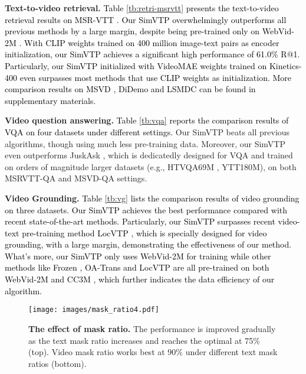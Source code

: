 \documentclass[10pt,twocolumn,letterpaper]{article}
\newcommand{\yty}[1]{\textcolor{black}{#1}}
\begin{document}
\noindent\textbf{Text-to-video retrieval.}
\yty{Table \ref{tb:retri-msrvtt} presents the text-to-video retrieval results on MSR-VTT \cite{xu2016msr}. Our SimVTP overwhelmingly outperforms all previous methods by a large margin, despite being pre-trained only on WebVid-2M \cite{bain2021frozen}.  With CLIP weights trained on 400 million image-text pairs as encoder initialization, our SimVTP achieves a significant high performance of 61.0\% R@1.  Particularly,  our SimVTP initialized with VideoMAE \cite{tong2022videomae} weights trained on Kinetics-400 \cite{kay2017kinetics} even surpasses most methods that use CLIP weights as initialization. \yty{More comparison results on MSVD \cite{chen2011collecting}, DiDemo \cite{anne2017localizing} and LSMDC \cite{rohrbach2015dataset} can be found in supplementary materials. }}



\noindent\textbf{Video question answering.} 
\yty{Table \ref{tb:vqa} reports the comparison results of VQA on four datasets under different settings.} Our SimVTP beats all previous algorithms, though using much less pre-training data. Moreover, our SimVTP even outperforms JuskAsk \cite{yang2021just}, which is dedicatedly designed for VQA and trained on orders of magnitude larger datasets (e.g., HTVQA69M , YTT180M), on both MSRVTT-QA and MSVD-QA settings.


\noindent\textbf{Video Grounding.} 
\yty{Table \ref{tb:vg} lists the comparison results of video grounding on three datasets. Our SimVTP achieves the best performance compared with recent state-of-the-art methods. Particularly, our SimVTP surpasses recent video-text pre-training method LocVTP \cite{cao2022locvtp}, which is specially designed for video grounding, with a large margin, demonstrating the effectiveness of our method. What's more, our SimVTP only uses WebVid-2M for training while other methods like Frozen \cite{bain2021frozen}, OA-Trans \cite{wang2022object} and LocVTP \cite{cao2022locvtp} are all pre-trained on both WebVid-2M \cite{bain2021frozen} and CC3M \cite{sharma2018conceptual}, which further indicates the data efficiency of our algorithm.}


\begin{figure}[t]
	\texttt{[image: images/mask\_ratio4.pdf]}
	\caption{\textbf{The effect of mask ratio.} The performance is improved gradually as the text mask ratio increases and reaches the optimal at 75\% (top). Video mask ratio works best at 90\% under different text mask ratios (bottom). }\label{fig:maskratio}
	\vspace{-0.5cm}
\end{figure}
\end{document}
